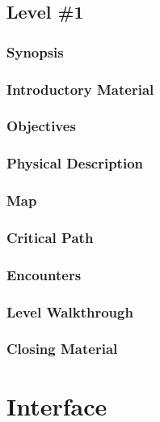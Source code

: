 \documentclass[12pt,titlepage]{article}
\begin{document}
\subsection{Level \#1}

\subsubsection{Synopsis}

\subsubsection{Introductory Material}

\subsubsection{Objectives}

\subsubsection{Physical Description}

\subsubsection{Map}

\subsubsection{Critical Path}

\subsubsection{Encounters}

\subsubsection{Level Walkthrough}

\subsubsection{Closing Material}


\newpage
\section{Interface}
\end{document}
